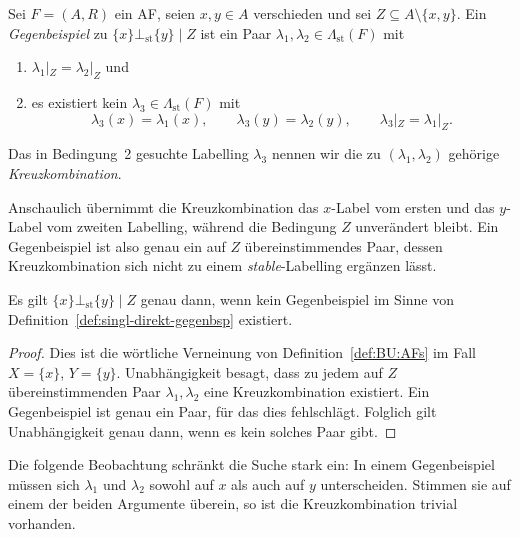 \begin{Definition}
    \label{def:singl-direkt-gegenbsp}
    Sei \(F=(A,R)\) ein AF, seien \(x,y\in A\) verschieden und sei
    \(Z\subseteq A\setminus\{x,y\}\). Ein \emph{Gegenbeispiel} zu
    \(\{x\}\bot_{\mathrm{st}}\{y\}\mid Z\) ist ein Paar
    \(\lambda_1,\lambda_2\in\Lambda_{\mathrm{st}}(F)\) mit
    \begin{enumerate}
        \item \(\lambda_1|_Z=\lambda_2|_Z\) und
        \item es existiert kein \(\lambda_3\in\Lambda_{\mathrm{st}}(F)\) mit
              \[
                  \lambda_3(x)=\lambda_1(x),\qquad
                  \lambda_3(y)=\lambda_2(y),\qquad
                  \lambda_3|_Z=\lambda_1|_Z.
              \]
    \end{enumerate}
    Das in Bedingung~2 gesuchte Labelling \(\lambda_3\) nennen wir die zu
    \((\lambda_1,\lambda_2)\) gehörige \emph{Kreuzkombination}.
\end{Definition}

Anschaulich übernimmt die Kreuzkombination das \(x\)-Label vom ersten und das
\(y\)-Label vom zweiten Labelling, während die Bedingung \(Z\) unverändert
bleibt. Ein Gegenbeispiel ist also genau ein auf \(Z\) übereinstimmendes Paar,
dessen Kreuzkombination sich nicht zu einem \textit{stable}-Labelling
ergänzen lässt.

\begin{Proposition}
    \label{prop:singl-direkt}
    Es gilt \(\{x\}\bot_{\mathrm{st}}\{y\}\mid Z\) genau dann, wenn kein
    Gegenbeispiel im Sinne von Definition~\ref{def:singl-direkt-gegenbsp}
    existiert.
\end{Proposition}

\begin{proof}
    \label{pr:singl-direkt}
    Dies ist die wörtliche Verneinung von Definition~\ref{def:BU:AFs} im Fall
    \(X=\{x\}\), \(Y=\{y\}\). Unabhängigkeit besagt, dass zu jedem auf \(Z\)
    übereinstimmenden Paar \(\lambda_1,\lambda_2\) eine Kreuzkombination
    existiert. Ein Gegenbeispiel ist genau ein Paar, für das dies fehlschlägt.
    Folglich gilt Unabhängigkeit genau dann, wenn es kein solches Paar gibt.
\end{proof}

Die folgende Beobachtung schränkt die Suche stark ein: In einem Gegenbeispiel
müssen sich \(\lambda_1\) und \(\lambda_2\) sowohl auf \(x\) als auch auf \(y\)
unterscheiden. Stimmen sie auf einem der beiden Argumente überein, so ist die
Kreuzkombination trivial vorhanden.

